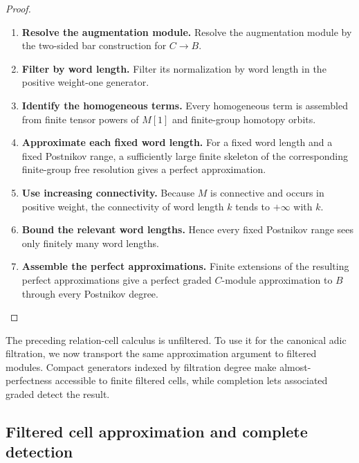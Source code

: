 \begin{proof}
\leavevmode
\begin{enumerate}[label=\textup{(\arabic*)}]
    \item \textbf{Resolve the augmentation module.}
    Resolve the augmentation module by the two-sided bar construction for
    \(C\to B\).
    \item \textbf{Filter by word length.}
    Filter its normalization by word length in the positive
    weight-one generator.
    \item \textbf{Identify the homogeneous terms.}
    Every homogeneous term is assembled from finite tensor
    powers of \(M[1]\) and finite-group homotopy orbits.
    \item \textbf{Approximate each fixed word length.}
    For a fixed word length
    and a fixed Postnikov range, a sufficiently large finite skeleton of the
    corresponding finite-group free resolution gives a perfect approximation.
    \item \textbf{Use increasing connectivity.}
    Because \(M\) is connective and occurs in positive weight, the connectivity of
    word length \(k\) tends to \(+\infty\) with \(k\).
    \item \textbf{Bound the relevant word lengths.}
    Hence every fixed
    Postnikov range sees only finitely many word lengths.
    \item \textbf{Assemble the perfect approximations.}
    Finite extensions of the
    resulting perfect approximations give a perfect graded \(C\)-module
    approximation to \(B\) through every Postnikov degree.
\end{enumerate}
\end{proof}

The preceding relation-cell calculus is unfiltered. To use it for the canonical adic
filtration, we now transport the same approximation argument to filtered modules.
Compact generators indexed by filtration degree make almost-perfectness accessible to
finite filtered cells, while completion lets associated graded detect the result.

\subsection{Filtered cell approximation and complete detection}

